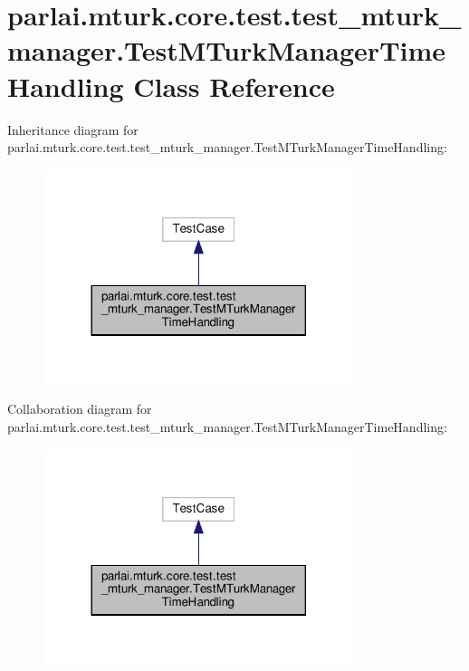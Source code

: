 \hypertarget{classparlai_1_1mturk_1_1core_1_1test_1_1test__mturk__manager_1_1TestMTurkManagerTimeHandling}{}\section{parlai.\+mturk.\+core.\+test.\+test\+\_\+mturk\+\_\+manager.\+Test\+M\+Turk\+Manager\+Time\+Handling Class Reference}
\label{classparlai_1_1mturk_1_1core_1_1test_1_1test__mturk__manager_1_1TestMTurkManagerTimeHandling}


Inheritance diagram for parlai.\+mturk.\+core.\+test.\+test\+\_\+mturk\+\_\+manager.\+Test\+M\+Turk\+Manager\+Time\+Handling\+:
\nopagebreak
\begin{figure}[H]
\begin{center}
\leavevmode
\includegraphics[width=257pt]{d8/d5d/classparlai_1_1mturk_1_1core_1_1test_1_1test__mturk__manager_1_1TestMTurkManagerTimeHandling__inherit__graph}
\end{center}
\end{figure}


Collaboration diagram for parlai.\+mturk.\+core.\+test.\+test\+\_\+mturk\+\_\+manager.\+Test\+M\+Turk\+Manager\+Time\+Handling\+:
\nopagebreak
\begin{figure}[H]
\begin{center}
\leavevmode
\includegraphics[width=257pt]{d5/d49/classparlai_1_1mturk_1_1core_1_1test_1_1test__mturk__manager_1_1TestMTurkManagerTimeHandling__coll__graph}
\end{center}
\end{figure}
